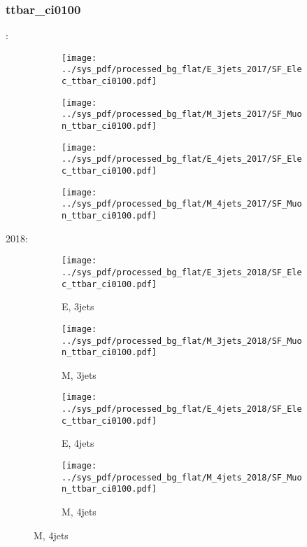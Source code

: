 \documentclass{beamer}
\begin{document}
\begin{frame}
\frametitle{ttbar_ci0100}
\fontsize{5}{1}:
\begin{figure}
\centering
\begin{subfigure}[b]{0.24\textwidth}
\texttt{[image: ../sys\_pdf/processed\_bg\_flat/E\_3jets\_2017/SF\_Elec\_ttbar\_ci0100.pdf]}
\end{subfigure}
\begin{subfigure}[b]{0.24\textwidth}
\texttt{[image: ../sys\_pdf/processed\_bg\_flat/M\_3jets\_2017/SF\_Muon\_ttbar\_ci0100.pdf]}
\end{subfigure}
\begin{subfigure}[b]{0.24\textwidth}
\texttt{[image: ../sys\_pdf/processed\_bg\_flat/E\_4jets\_2017/SF\_Elec\_ttbar\_ci0100.pdf]}
\end{subfigure}
\begin{subfigure}[b]{0.24\textwidth}
\texttt{[image: ../sys\_pdf/processed\_bg\_flat/M\_4jets\_2017/SF\_Muon\_ttbar\_ci0100.pdf]}
\end{subfigure}
\end{figure}
2018:
\begin{figure}
\centering
\begin{subfigure}[b]{0.24\textwidth}
\texttt{[image: ../sys\_pdf/processed\_bg\_flat/E\_3jets\_2018/SF\_Elec\_ttbar\_ci0100.pdf]}
\captionsetup{font=tiny}
\caption{E, 3jets}
\end{subfigure}
\begin{subfigure}[b]{0.24\textwidth}
\texttt{[image: ../sys\_pdf/processed\_bg\_flat/M\_3jets\_2018/SF\_Muon\_ttbar\_ci0100.pdf]}
\captionsetup{font=tiny}
\caption{M, 3jets}
\end{subfigure}
\begin{subfigure}[b]{0.24\textwidth}
\texttt{[image: ../sys\_pdf/processed\_bg\_flat/E\_4jets\_2018/SF\_Elec\_ttbar\_ci0100.pdf]}
\captionsetup{font=tiny}
\caption{E, 4jets}
\end{subfigure}
\begin{subfigure}[b]{0.24\textwidth}
\texttt{[image: ../sys\_pdf/processed\_bg\_flat/M\_4jets\_2018/SF\_Muon\_ttbar\_ci0100.pdf]}
\captionsetup{font=tiny}
\caption{M, 4jets}
\end{subfigure}
\end{figure}
\end{frame}
\end{document}
